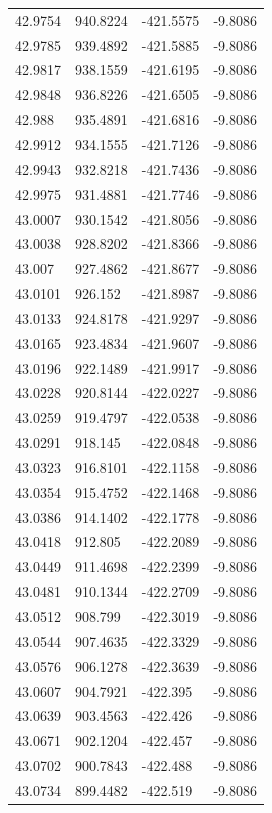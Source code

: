 \begin{table}[H]
\begin{tabular}{llll}
42.9754 & 940.8224 & -421.5575 & -9.8086 \\
42.9785 & 939.4892 & -421.5885 & -9.8086 \\
42.9817 & 938.1559 & -421.6195 & -9.8086 \\
42.9848 & 936.8226 & -421.6505 & -9.8086 \\
42.988 & 935.4891 & -421.6816 & -9.8086 \\
42.9912 & 934.1555 & -421.7126 & -9.8086 \\
42.9943 & 932.8218 & -421.7436 & -9.8086 \\
42.9975 & 931.4881 & -421.7746 & -9.8086 \\
43.0007 & 930.1542 & -421.8056 & -9.8086 \\
43.0038 & 928.8202 & -421.8366 & -9.8086 \\
43.007 & 927.4862 & -421.8677 & -9.8086 \\
43.0101 & 926.152 & -421.8987 & -9.8086 \\
43.0133 & 924.8178 & -421.9297 & -9.8086 \\
43.0165 & 923.4834 & -421.9607 & -9.8086 \\
43.0196 & 922.1489 & -421.9917 & -9.8086 \\
43.0228 & 920.8144 & -422.0227 & -9.8086 \\
43.0259 & 919.4797 & -422.0538 & -9.8086 \\
43.0291 & 918.145 & -422.0848 & -9.8086 \\
43.0323 & 916.8101 & -422.1158 & -9.8086 \\
43.0354 & 915.4752 & -422.1468 & -9.8086 \\
43.0386 & 914.1402 & -422.1778 & -9.8086 \\
43.0418 & 912.805 & -422.2089 & -9.8086 \\
43.0449 & 911.4698 & -422.2399 & -9.8086 \\
43.0481 & 910.1344 & -422.2709 & -9.8086 \\
43.0512 & 908.799 & -422.3019 & -9.8086 \\
43.0544 & 907.4635 & -422.3329 & -9.8086 \\
43.0576 & 906.1278 & -422.3639 & -9.8086 \\
43.0607 & 904.7921 & -422.395 & -9.8086 \\
43.0639 & 903.4563 & -422.426 & -9.8086 \\
43.0671 & 902.1204 & -422.457 & -9.8086 \\
43.0702 & 900.7843 & -422.488 & -9.8086 \\
43.0734 & 899.4482 & -422.519 & -9.8086 \\

\end{tabular}
\end{table}
